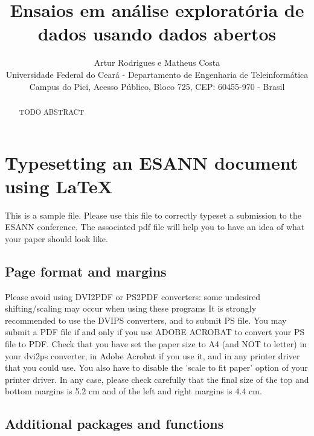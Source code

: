 \documentclass{esannV2}
\begin{document}
\title{Ensaios em análise exploratória de dados usando dados abertos}

\author{Artur Rodrigues e Matheus Costa
\vspace{.3cm}\\
Universidade Federal do Ceará - Departamento de Engenharia de Teleinformática\\
Campus do Pici, Acesso Público, Bloco 725, CEP: 60455-970 - Brasil\\}

\maketitle

\begin{abstract}
TODO ABSTRACT
\end{abstract}

\section{Typesetting an ESANN document using \LaTeX}

This is a sample file. Please use this file to correctly typeset a
submission to the ESANN conference. The associated pdf file will
help you to have an idea of what your paper should look like.

\subsection{Page format and margins}

Please avoid using DVI2PDF or PS2PDF converters: some undesired
shifting/scaling may occur when using these programs
It is strongly recommended to use the DVIPS converters, and to submit
PS file. You may submit a PDF file if and only if you use ADOBE ACROBAT
to convert your PS file to PDF.
%
Check that you have set the paper size to A4 (and NOT to letter) in your
dvi2ps converter, in Adobe Acrobat if you use it, and in any printer driver
that you could use.  You also have to disable the 'scale to fit paper' option
of your printer driver.
%
In any case, please check carefully that the final size of the top and
bottom margins is 5.2 cm and of the left and right margins is 4.4 cm.

\subsection{Additional packages and functions}
\end{document}

